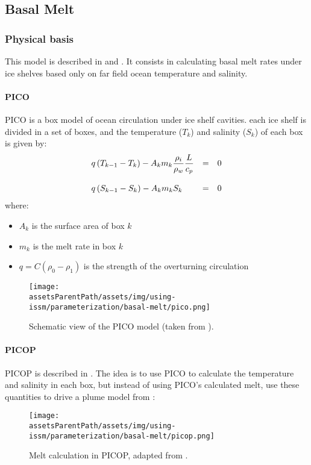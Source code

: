
\subsection{Basal Melt} \label{sec:using-issm-parameterization-basal-melt}
\subsubsection{Physical basis}
This model is described in \cite{Reese2018} and \cite{Pelle2019}. It consists in calculating basal melt rates under ice shelves based only on far field ocean temperature and salinity.

\paragraph{PICO}
PICO is a box model of ocean circulation under ice shelf cavities. each ice shelf is divided in a set of boxes, and the temperature ($T_k$) and salinity ($S_k$) of each box is given by:
\begin{equation}
	\begin{array}{l c l}
		\displaystyle q\left(T_{k-1} - T_k\right) - A_k m_k \frac{\rho_i}{\rho_w} \frac{L}{c_p}& =& 0\\
		\\
		q\left(S_{k-1} - S_k\right) - A_k m_k S_k & =& 0
	\end{array}
\end{equation}
where:
\begin{itemize}
	\item $A_k$ is the surface area of box $k$
	\item $m_k$ is the melt rate in box $k$
	\item $q = C \left(\rho_0 - \rho_1\right)$ is the strength of the overturning circulation
\end{itemize}

\begin{figure}[H]
	\begin{center}
		\texttt{[image: \\assetsParentPath/assets/img/using-issm/parameterization/basal-melt/pico.png]}
		\caption{Schematic view of the PICO model (taken from \cite{Reese2018}).}
	\end{center}
\end{figure}

\paragraph{PICOP}
PICOP is described in \cite{Pelle2019}. The idea is to use PICO to calculate the temperature and salinity in each box, but instead of using PICO's calculated melt, use these quantities to drive a plume model from \cite{Lazeroms2018}:
\begin{figure}[H]
	\begin{center}
		\texttt{[image: \\assetsParentPath/assets/img/using-issm/parameterization/basal-melt/picop.png]}
		\caption{Melt calculation in PICOP, adapted from \cite{Pelle2019}.}
	\end{center}
\end{figure}

